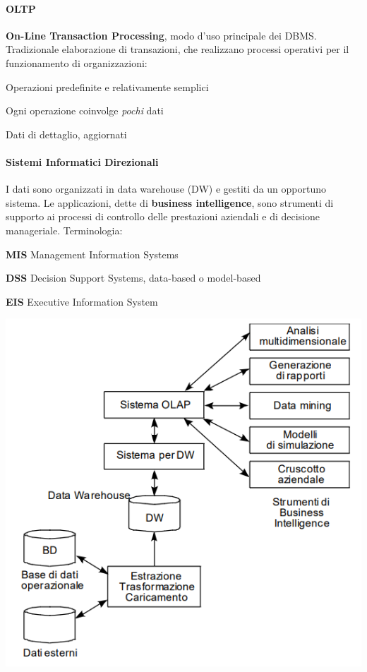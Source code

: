 \documentclass[10pt]{book}
\begin{document}
\begin{multicols}{2}
\paragraph{OLTP} \textbf{On-Line Transaction Processing}, modo d'uso principale dei DBMS. Tradizionale elaborazione di transazioni, che realizzano processi operativi per il funzionamento di organizzazioni:
\begin{list}{}{}
	\item Operazioni predefinite e relativamente semplici
	\item Ogni operazione coinvolge \textit{pochi} dati
	\item Dati di dettaglio, aggiornati
\end{list}
\end{multicols}
\begin{multicols}{2}
\paragraph{Sistemi Informatici Direzionali} I dati sono organizzati in data warehouse (DW) e gestiti da un opportuno sistema. Le applicazioni, dette di \textbf{business intelligence}, sono strumenti di supporto ai processi di controllo delle prestazioni aziendali e di decisione manageriale. Terminologia:
\begin{list}{}{}
	\item \textbf{MIS} Management Information Systems
	\item \textbf{DSS} Decision Support Systems, data-based o model-based
	\item \textbf{EIS} Executive Information System
\end{list}
\begin{center}
	\includegraphics[scale=0.6]{sisinfdir.png}
\end{center}
\columnbreak

\end{multicols}
\end{document}
